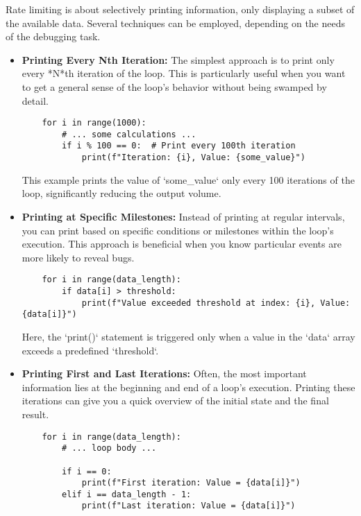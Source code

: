 \documentclass{article}
\begin{document}
{{{Rate limiting is about selectively printing information, only displaying a subset of the available data. Several techniques can be employed, depending on the needs of the debugging task.

\begin{itemize}
    \item \textbf{Printing Every Nth Iteration:} The simplest approach is to print only every *N*th iteration of the loop. This is particularly useful when you want to get a general sense of the loop's behavior without being swamped by detail.

    \begin{verbatim}
    for i in range(1000):
        # ... some calculations ...
        if i % 100 == 0:  # Print every 100th iteration
            print(f"Iteration: {i}, Value: {some_value}")
    \end{verbatim}

    This example prints the value of `some_value` only every 100 iterations of the loop, significantly reducing the output volume.

    \item \textbf{Printing at Specific Milestones:} Instead of printing at regular intervals, you can print based on specific conditions or milestones within the loop's execution. This approach is beneficial when you know particular events are more likely to reveal bugs.

    \begin{verbatim}
    for i in range(data_length):
        if data[i] > threshold:
            print(f"Value exceeded threshold at index: {i}, Value: {data[i]}")
    \end{verbatim}

    Here, the `print()` statement is triggered only when a value in the `data` array exceeds a predefined `threshold`.

    \item \textbf{Printing First and Last Iterations:} Often, the most important information lies at the beginning and end of a loop's execution. Printing these iterations can give you a quick overview of the initial state and the final result.

    \begin{verbatim}
    for i in range(data_length):
        # ... loop body ...

        if i == 0:
            print(f"First iteration: Value = {data[i]}")
        elif i == data_length - 1:
            print(f"Last iteration: Value = {data[i]}")
    \end{verbatim}


\end{itemize}}}}
\end{document}
